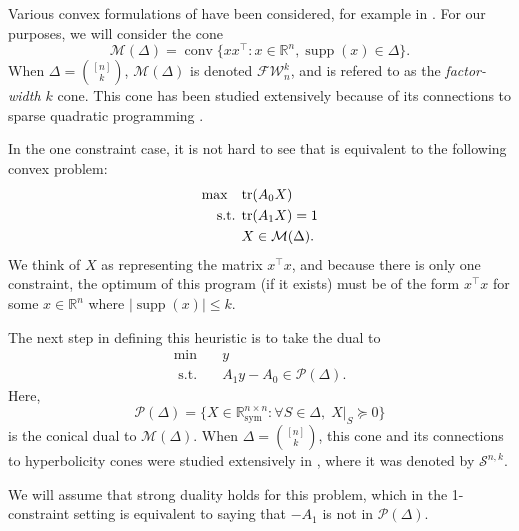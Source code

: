 \documentclass{amsart}
\theoremstyle{definition}
\newcommand{\R}{\mathbb{R}}
\newcommand{\tr}{\textup{tr}}
\newcommand{\FW}{\mathcal{F}\mathcal{W}}
\renewcommand{\P}{\mathcal{P}}
\newcommand{\M}{\mathcal{M}}
\DeclareMathOperator*{\supp}{supp}
\newcommand{\st}{{\text{ s.t. }}}
\DeclareMathOperator{\conv}{\operatorname{conv}}
\newcommand*{\Sym}{\R^{n \times n}_{\mathrm{sym}}}
\begin{document}
Various convex formulations of  have been considered, for example in \cite{atamturk2019rank, bach2010convex}.
For our purposes, we will consider the cone
\[
    \M(\Delta) = \conv \{xx^{\intercal} : x \in \R^n, \supp(x) \in \Delta\}.
\]
When $\Delta = \binom{[n]}{k}$, $\M(\Delta)$ is denoted $\FW^k_n$, and is refered to as the \emph{factor-width $k$} cone.
This cone has been studied extensively because of its connections to sparse quadratic programming \cite{boman2005factor, gouveia2022sums}.

In the one constraint case, it is not hard to see that  is equivalent to the following convex problem:
\begin{equation}
    \begin{aligned}
        \max\quad & \tr(A_0X)\\
        \st & \tr(A_1X) = 1\\
            & X \in \M(\Delta).
    \end{aligned}
    \label{eq:sparse_sdp}
\end{equation}
We think of $X$ as representing the matrix $x^{\intercal}x$, and because there is only one constraint, the optimum of this program (if it exists) must be of the form $x^{\intercal}x$ for some $x \in \R^n$ where $|\supp(x)| \le k$.

The next step in defining this heuristic is to take the dual to 
\begin{equation}\label{eq:sparse_sdp_dual}
    \begin{aligned}
        \min\quad & y\\
        \st & A_1y - A_0 \in \P(\Delta).
    \end{aligned}
\end{equation}
Here,
\[
    \P(\Delta) = \{X \in \Sym : \forall S \in \Delta,\;X|_S \succeq 0\}
\] is the conical dual to $\M(\Delta)$.
When $\Delta = \binom{[n]}{k}$, this cone and its connections to hyperbolicity cones were studied extensively in \cite{blekherman2022hyperbolic}, where it was denoted by $\mathcal{S}^{n,k}$.

We will assume that strong duality holds for this problem, which in the 1-constraint setting is equivalent to saying that $-A_1$ is not in $\mathcal{P}(\Delta)$.
\end{document}
